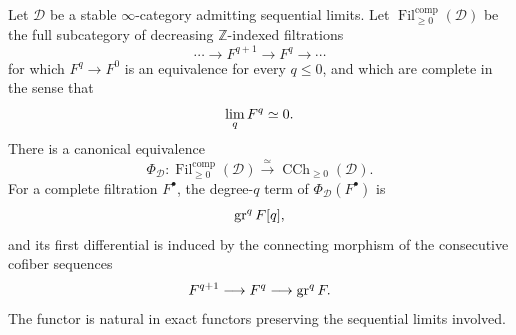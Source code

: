 \begin{theorem}
\label{thm:complete-filtered-coherent-cochains}
Let \(\mathcal D\) be a stable \(\infty\)-category admitting sequential limits.  Let
\(\operatorname{Fil}^{\mathrm{comp}}_{\geq0}(\mathcal D)\) be the full subcategory of decreasing
\(\mathbb Z\)-indexed filtrations
\[
    \cdots\to F^{q+1}\to F^q\to\cdots
\]
for which \(F^q\to F^0\) is an equivalence for every \(q\leq0\), and which are complete in the
sense that
\[
    \operatorname*{lim}_qF^q\simeq0.
\]
There is a canonical equivalence
\[
\boxed{
    \Phi_{\mathcal D}:
    \operatorname{Fil}^{\mathrm{comp}}_{\geq0}(\mathcal D)
    \xrightarrow{\simeq}
    \operatorname{CCh}_{\geq0}(\mathcal D).
}
\]
For a complete filtration \(F^\bullet\), the degree-\(q\) term of
\(\Phi_{\mathcal D}(F^\bullet)\) is
\[
    \operatorname{gr}^qF[q],
\]
and its first differential is induced by the connecting morphism of the consecutive cofiber
sequences
\[
    F^{q+1}\longrightarrow F^q\longrightarrow\operatorname{gr}^qF.
\]
The functor is natural in exact functors preserving the sequential limits involved.
\end{theorem}


